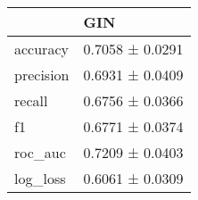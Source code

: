\begin{tabular}{ll}
\toprule
 & GIN \\
\midrule
accuracy & 0.7058 ± 0.0291 \\
precision & 0.6931 ± 0.0409 \\
recall & 0.6756 ± 0.0366 \\
f1 & 0.6771 ± 0.0374 \\
roc_auc & 0.7209 ± 0.0403 \\
log_loss & 0.6061 ± 0.0309 \\
\bottomrule
\end{tabular}
